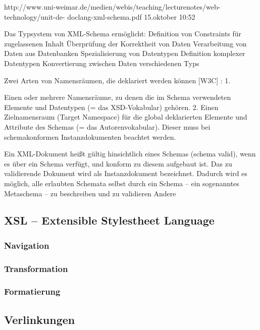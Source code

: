 
http://www.uni-weimar.de/medien/webis/teaching/lecturenotes/web-technology/unit-de-
doclang-xml-schema.pdf 15.oktober 10:52

Das Typsystem von XML-Schema ermöglicht: 
Definition von Constraints für zugelassenen Inhalt 
Überprüfung der Korrektheit von Daten 
Verarbeitung von Daten aus Datenbanken 
Spezialisierung von Datentypen 
Definition komplexer Datentypen 
Konvertierung zwischen Daten verschiedenen Typs

Zwei Arten von Namensräumen, die deklariert werden können [W3C] : 1.

Einen oder mehrere Namensräume, zu denen die im Schema verwendeten Elemente und Datentypen (= das XSD-Vokabular) gehören. 2. Einen Zielnamensraum (Target Namespace) für die global deklarierten Elemente und Attribute des Schemas (= das Autorenvokabular). Dieser muss bei schemakonformen Instanzdokumenten beachtet werden.

Ein XML-Dokument heißt gültig hinsichtlich eines Schemas (schema valid), wenn es über ein Schema verfügt, und konform zu diesem aufgebaut ist. Das zu validierende Dokument wird als Instanzdokument bezeichnet. Dadurch wird es möglich, alle erlaubten Schemata selbst durch ein Schema – ein sogenanntes Metaschema – zu beschreiben und zu validieren
Andere

\subsection{XSL -- Extensible Stylestheet Language}
\subsubsection{Navigation}



\subsubsection{Transformation}



\subsubsection{Formatierung}



\subsection{Verlinkungen}

